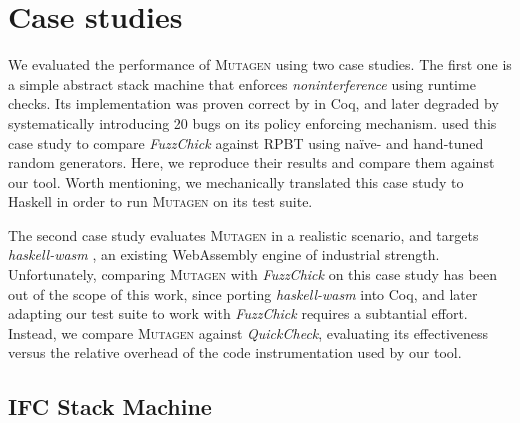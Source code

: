 \documentclass[sigconf,review,anonymous]{acmart}
\newcommand{\quickcheck}{\textit{QuickCheck}\xspace}
\newcommand{\fuzzchick}{\textit{FuzzChick}\xspace}
\newcommand{\mutagen}{\textsc{Mutagen}\xspace}
\begin{document}




\section{Case studies}
\label{sec:casestudies}

We evaluated the performance of \mutagen using two case studies.
%
The first one is a simple abstract stack machine that enforces
\emph{noninterference} \cite{goguen1982security} using runtime checks.
%
Its implementation was proven correct by \citeauthor{10.1145/2578855.2535839}
\citeyear{10.1145/2578855.2535839} in Coq, and later degraded by
systematically introducing 20 bugs on its policy enforcing mechanism.
%
\citeauthor{lampropoulos2019coverage} used this case study to compare \fuzzchick
against RPBT using na\"ive- and hand-tuned random generators.
%
Here, we reproduce their results and compare them against our tool.
%
Worth mentioning, we mechanically translated this case study to Haskell in order
to run \mutagen on its test suite.


The second case study evaluates \mutagen in a realistic scenario, and targets
\textit{haskell-wasm} \cite{haskellwasm}, an existing WebAssembly engine of
industrial strength.
%
%
Unfortunately, comparing \mutagen with \fuzzchick on this case study has been
out of the scope of this work, since porting \textit{haskell-wasm} into Coq, and
later adapting our test suite to work with \fuzzchick requires a subtantial
effort.
%
Instead, we compare \mutagen against \quickcheck, evaluating its effectiveness
versus the relative overhead of the code instrumentation used by our tool.



\subsection{IFC Stack Machine}
\end{document}
